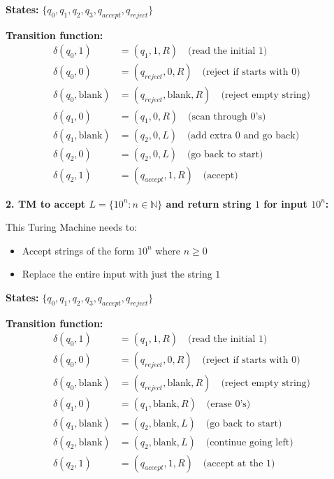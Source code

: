 \documentclass{article}
\begin{document}
\textbf{States:} $\{q_0, q_1, q_2, q_3, q_{accept}, q_{reject}\}$

\textbf{Transition function:}
\begin{align}
\delta(q_0, 1) &= (q_1, 1, R) \quad \text{(read the initial 1)} \\
\delta(q_0, 0) &= (q_{reject}, 0, R) \quad \text{(reject if starts with 0)} \\
\delta(q_0, \text{blank}) &= (q_{reject}, \text{blank}, R) \quad \text{(reject empty string)} \\
\delta(q_1, 0) &= (q_1, 0, R) \quad \text{(scan through 0's)} \\
\delta(q_1, \text{blank}) &= (q_2, 0, L) \quad \text{(add extra 0 and go back)} \\
\delta(q_2, 0) &= (q_2, 0, L) \quad \text{(go back to start)} \\
\delta(q_2, 1) &= (q_{accept}, 1, R) \quad \text{(accept)}
\end{align}

\textbf{2. TM to accept $L = \{10^n : n \in \mathbb{N}\}$ and return string $1$ for input $10^n$:}

This Turing Machine needs to:
\begin{itemize}
\item Accept strings of the form $10^n$ where $n \geq 0$
\item Replace the entire input with just the string $1$
\end{itemize}

\textbf{States:} $\{q_0, q_1, q_2, q_3, q_{accept}, q_{reject}\}$

\textbf{Transition function:}
\begin{align}
\delta(q_0, 1) &= (q_1, 1, R) \quad \text{(read the initial 1)} \\
\delta(q_0, 0) &= (q_{reject}, 0, R) \quad \text{(reject if starts with 0)} \\
\delta(q_0, \text{blank}) &= (q_{reject}, \text{blank}, R) \quad \text{(reject empty string)} \\
\delta(q_1, 0) &= (q_1, \text{blank}, R) \quad \text{(erase 0's)} \\
\delta(q_1, \text{blank}) &= (q_2, \text{blank}, L) \quad \text{(go back to start)} \\
\delta(q_2, \text{blank}) &= (q_2, \text{blank}, L) \quad \text{(continue going left)} \\
\delta(q_2, 1) &= (q_{accept}, 1, R) \quad \text{(accept at the 1)}
\end{align}
\end{document}
